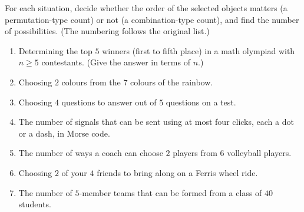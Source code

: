 For each situation, decide whether the order of the selected objects matters (a permutation-type count) or not (a combination-type count), and find the number of possibilities. (The numbering follows the original list.)
\begin{enumerate}
\item[1.] Determining the top $5$ winners (first to fifth place) in a math olympiad with $n\ge5$ contestants. (Give the answer in terms of $n$.)
\item[3.] Choosing $2$ colours from the $7$ colours of the rainbow.
\item[4.] Choosing $4$ questions to answer out of $5$ questions on a test.
\item[6.] The number of signals that can be sent using at most four clicks, each a dot or a dash, in Morse code.
\item[7.] The number of ways a coach can choose $2$ players from $6$ volleyball players.
\item[9.] Choosing $2$ of your $4$ friends to bring along on a Ferris wheel ride.
\item[10.] The number of $5$-member teams that can be formed from a class of $40$ students.
\end{enumerate}
